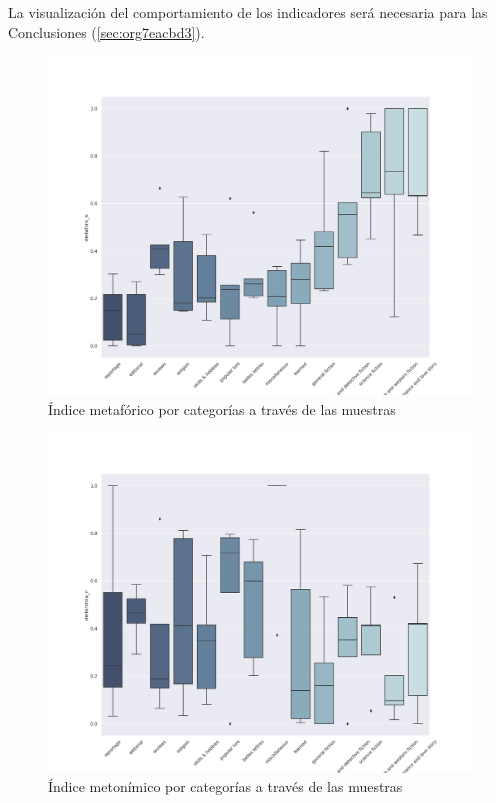 \documentclass[12pt,letterpaper,twoside]{article}
\begin{document}
La visualización del comportamiento de los indicadores será necesaria para las Conclusiones (\ref{sec:org7eacbd3}).

\begin{figure}[H]
\centering
\includegraphics[width=0.9\linewidth]{./resultados/graphs/total/accum_cat_metafora.png}
\caption{\label{fig:metafora_categorias} Índice metafórico por categorías a través de las muestras }
\end{figure}
\begin{figure}[H]
\centering
\includegraphics[width=0.9\linewidth]{./resultados/graphs/total/accum_cat_metonimia.png}
\caption{\label{fig:metonimia_categorias} Índice metonímico por categorías a través de las muestras  }
\end{figure}
\end{document}
